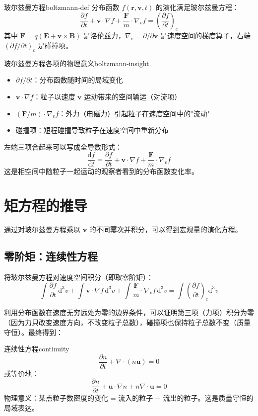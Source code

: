 \documentclass[12pt,a4paper,openany,oneside]{book}
\newcommand{\diff}{\mathrm{d}}
\newcommand{\vect}[1]{\bm{#1}}
\newcommand{\grad}{\nabla}
\newcommand{\divg}{\nabla\cdot}
\newcommand{\difficulty}[1]{\marginnote{\textcolor{red}{\textbf{[#1]}}}}
\begin{document}
\begin{definition}{玻尔兹曼方程}{boltzmann-def}
分布函数 $f(\vect{r},\vect{v},t)$ 的演化满足玻尔兹曼方程：
\[
\frac{\partial f}{\partial t} + \vect{v}\cdot\grad f + \frac{\vect{F}}{m}\cdot\grad_v f = \left(\frac{\partial f}{\partial t}\right)_c
\]
其中 $\vect{F} = q(\vect{E} + \vect{v}\times\vect{B})$ 是洛伦兹力，$\grad_v = \partial/\partial\vect{v}$ 是速度空间的梯度算子，右端 $(\partial f/\partial t)_c$ 是碰撞项。
\end{definition}

\begin{insight}{玻尔兹曼方程各项的物理意义}{boltzmann-insight}
\begin{itemize}
\item $\partial f/\partial t$：分布函数随时间的局域变化
\item $\vect{v}\cdot\grad f$：粒子以速度 $\vect{v}$ 运动带来的空间输运（对流项）
\item $(\vect{F}/m)\cdot\grad_v f$：外力（电磁力）引起粒子在速度空间中的"流动"
\item 碰撞项：短程碰撞导致粒子在速度空间中重新分布
\end{itemize}
左端三项合起来可以写成全导数形式：
\[
\frac{\diff f}{\diff t} = \frac{\partial f}{\partial t} + \vect{v}\cdot\grad f + \frac{\vect{F}}{m}\cdot\grad_v f
\]
这是相空间中随粒子一起运动的观察者看到的分布函数变化率。
\end{insight}

\section{矩方程的推导}\difficulty{提高}

通过对玻尔兹曼方程乘以 $\vect{v}$ 的不同幂次并积分，可以得到宏观量的演化方程。

\subsection{零阶矩：连续性方程}

将玻尔兹曼方程对速度空间积分（即取零阶矩）：
\[
\int \frac{\partial f}{\partial t}\,\diff^3v + \int \vect{v}\cdot\grad f\,\diff^3v + \int \frac{\vect{F}}{m}\cdot\grad_v f\,\diff^3v = \int \left(\frac{\partial f}{\partial t}\right)_c \diff^3v
\]

利用分布函数在速度无穷远处为零的边界条件，可以证明第三项（力项）积分为零（因为力只改变速度方向，不改变粒子总数），碰撞项也保持粒子总数不变（质量守恒）。最终得到：

\begin{theorem}{连续性方程}{continuity}
\[
\frac{\partial n}{\partial t} + \divg(n\vect{u}) = 0
\]
或等价地：
\[
\frac{\partial n}{\partial t} + \vect{u}\cdot\grad n + n\divg\vect{u} = 0
\]
物理意义：某点粒子数密度的变化 = 流入的粒子 $-$ 流出的粒子。这是质量守恒的局域表达。
\end{theorem}
\end{document}
